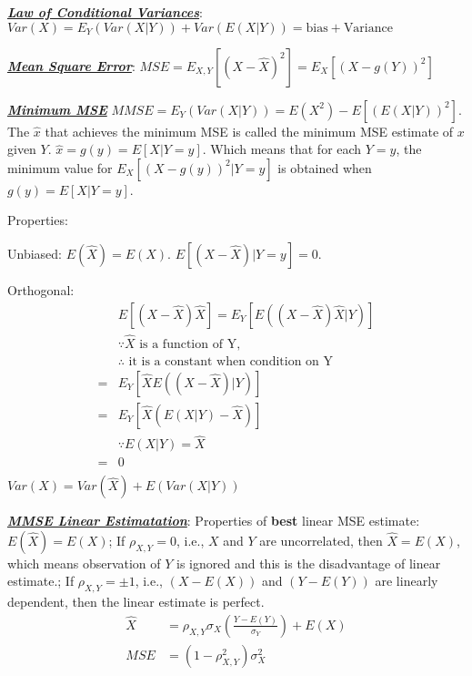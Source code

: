 \documentclass[12pt]{article}
\newcommand{\bulletPoint}[1]{\ul{\textit{\textbf{#1}}}}
\begin{document}
\begin{multicols*}{4}
\bulletPoint{Law of Conditional Variances}: $Var(X) = E_Y(Var(X|Y)) + Var(E(X|Y)) = \text{bias} + \text{Variance}$


\bulletPoint{Mean Square Error}: $MSE = E_{X,Y}[(X - \hat{X})^2] = E_X[(X-g(Y))^2]$

\bulletPoint{Minimum MSE} $MMSE = E_Y(Var(X|Y)) = E(X^2) - E[(E(X|Y))^2]$. The $\hat{x}$ that achieves the minimum MSE is called the minimum MSE estimate of $x$ given $Y$. $\hat{x}=g(y)=E[X|Y=y]$. Which means that for each $Y=y$, the minimum value for $E_X[(X-g(y))^2|Y=y]$ is obtained when $g(y)=E[X|Y=y]$.

Properties: 

Unbiased: $E(\hat{X}) = E(X)$. $E[(X-\hat{X})|Y=y] = 0$.

Orthogonal:
\useshortskip \begin{equation*}
    \begin{split}
    & E[(X-\hat{X})\hat{X}] = E_Y[E((X-\hat{X})\hat{X}|Y)]\\
                        & \text{$\because \hat{X}$ is a function of Y,}\\[-3pt]
                        & \text{$\therefore$ it is a constant when condition on Y}\\[-3pt]
                      = & E_Y[\hat{X} E((X-\hat{X})|Y)]\\
                      = & E_Y[\hat{X}(E(X|Y)-\hat{X})]\\
                      & \because E(X|Y)=\hat{X}\\
                      = & 0 \\[-5pt]
    \end{split}
\end{equation*}
$Var(X) = Var(\hat{X}) + E(Var(X|Y))$


\bulletPoint{MMSE Linear Estimatation}: Properties of \textbf{best} linear MSE estimate: $E(\hat{X}) = E(X)$; If $\rho_{X,Y}=0$, i.e., $X$ and $Y$ are uncorrelated, then $\hat{X}=E(X)$, which means observation of $Y$ is ignored and this is the disadvantage of linear estimate.; If $\rho_{X,Y}=\pm 1$, i.e., $(X-E(X))$ and $(Y-E(Y))$ are linearly dependent, then the linear estimate is perfect.
\useshortskip \begin{equation*}
    \begin{split}
        \hat{X} & = \rho_{X,Y}\sigma_X\left( \frac{Y-E(Y)}{\sigma_Y} \right) + E(X)\\[-4pt]
        MSE & = (1-\rho^2_{X,Y})\sigma^2_X
    \end{split}
\end{equation*}



\end{multicols*}
\end{document}
